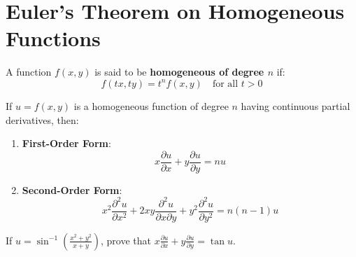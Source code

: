 \section{Euler's Theorem on Homogeneous Functions}

\begin{definition}
A function $f(x,y)$ is said to be \textbf{homogeneous of degree $n$} if:
\begin{equation}
f(tx, ty) = t^n f(x,y) \quad \text{for all } t > 0
\end{equation}
\end{definition}

\begin{theorem}
If $u = f(x,y)$ is a homogeneous function of degree $n$ having continuous partial derivatives, then:
\begin{enumerate}[leftmargin=1.5em]
    \item \textbf{First-Order Form}:
    \begin{equation}
    x \frac{\partial u}{\partial x} + y \frac{\partial u}{\partial y} = n u
    \end{equation}
    \item \textbf{Second-Order Form}:
    \begin{equation}
    x^2 \frac{\partial^2 u}{\partial x^2} + 2xy \frac{\partial^2 u}{\partial x \partial y} + y^2 \frac{\partial^2 u}{\partial y^2} = n(n-1)u
    \end{equation}
\end{enumerate}
\end{theorem}

\begin{example}
If $u = \sin^{-1}\left(\frac{x^2 + y^2}{x + y}\right)$, prove that $x \frac{\partial u}{\partial x} + y \frac{\partial u}{\partial y} = \tan u$.
\end{example}

